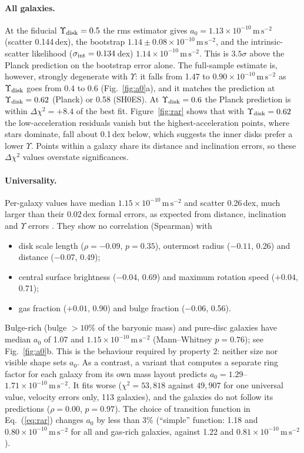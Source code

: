 \documentclass[11pt]{article}
\newcommand{\unit}[1]{\,\mathrm{#1}}
\newcommand{\aunit}{\times10^{-10}\unit{m\,s^{-2}}}
\begin{document}
\paragraph{All galaxies.} At the fiducial $\Upsilon_{\rm disk}=0.5$ the rms estimator gives $a_0=1.13\aunit$ (scatter 0.144\,dex), the bootstrap $1.14\pm0.08\aunit$, and the intrinsic-scatter likelihood ($\sigma_{\rm int}=0.134$\,dex) $1.14\aunit$. This is $3.5\sigma$ above the Planck prediction on the bootstrap error alone. The full-sample estimate is, however, strongly degenerate with $\Upsilon$: it falls from 1.47 to $0.90\aunit$ as $\Upsilon_{\rm disk}$ goes from 0.4 to 0.6 (Fig.~\ref{fig:a0}a), and it matches the prediction at $\Upsilon_{\rm disk}=0.62$ (Planck) or 0.58 (SH0ES). At $\Upsilon_{\rm disk}=0.6$ the Planck prediction is within $\Delta\chi^2=+8.4$ of the best fit. Figure~\ref{fig:rar} shows that with $\Upsilon_{\rm disk}=0.62$ the low-acceleration residuals vanish but the highest-acceleration points, where stars dominate, fall about 0.1\,dex below, which suggests the inner disks prefer a lower $\Upsilon$. Points within a galaxy share its distance and inclination errors, so these $\Delta\chi^2$ values overstate significances.

\paragraph{Universality.} Per-galaxy values have median $1.15\aunit$ and scatter 0.26\,dex, much larger than their 0.02\,dex formal errors, as expected from distance, inclination and $\Upsilon$ errors \citep{Li2018}. They show no correlation (Spearman) with
\begin{itemize}
\item disk scale length ($\rho=-0.09$, $p=0.35$), outermost radius ($-0.11$, 0.26) and distance ($-0.07$, 0.49);
\item central surface brightness ($-0.04$, 0.69) and maximum rotation speed ($+0.04$, 0.71);
\item gas fraction ($+0.01$, 0.90) and bulge fraction ($-0.06$, 0.56).
\end{itemize}
Bulge-rich (bulge $>10\%$ of the baryonic mass) and pure-disc galaxies have median $a_0$ of 1.07 and $1.15\aunit$ (Mann--Whitney $p=0.76$); see Fig.~\ref{fig:a0}b. This is the behaviour required by property 2: neither size nor visible shape sets $a_0$. As a contrast, a variant that computes a separate ring factor for each galaxy from its own mass layout predicts $a_0=1.29$--$1.71\aunit$. It fits worse ($\chi^2=53{,}818$ against $49{,}907$ for one universal value, velocity errors only, 113 galaxies), and the galaxies do not follow its predictions ($\rho=0.00$, $p=0.97$). The choice of transition function in Eq.~(\ref{eq:rar}) changes $a_0$ by less than 3\% (``simple'' function: 1.18 and $0.80\aunit$ for all and gas-rich galaxies, against 1.22 and $0.81\aunit$).
\end{document}
